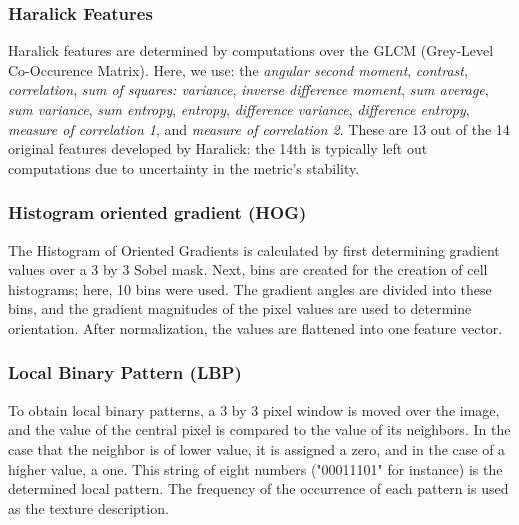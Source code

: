 
\subsubsection{Haralick Features}

Haralick features \cite{Haralick_1973} are determined by computations over the GLCM (Grey-Level Co-Occurence Matrix). Here, we use: the \emph{angular second moment}, \emph{contrast}, \emph{correlation}, \emph{sum of squares: variance}, \emph{inverse difference moment}, \emph{sum average}, \emph{sum variance}, \emph{sum entropy}, \emph{entropy}, \emph{difference variance}, \emph{difference entropy}, \emph{measure of correlation 1}, and \emph{measure of correlation 2}. These are 13 out of the 14 original features developed by Haralick: the 14th is typically left out computations due to uncertainty in the metric's stability. 

\subsubsection{Histogram oriented gradient (HOG)}

The Histogram of Oriented Gradients is calculated by first determining gradient values over a 3 by 3 Sobel mask. Next, bins are created for the creation of cell histograms; here, 10 bins were used. The gradient angles are divided into these bins, and the gradient magnitudes of the pixel values are used to determine orientation. After normalization, the values are flattened into one feature vector. 

\subsubsection{Local Binary Pattern (LBP)}

To obtain local binary patterns, a 3 by 3 pixel window is moved over the image, and the value of the central pixel is compared to the value of its neighbors. In the case that the neighbor is of lower value, it is assigned a zero, and in the case of a higher value, a one. This string of eight numbers ("00011101" for instance) is the determined local pattern. The frequency of the occurrence of each pattern is used as the texture description. 
  
  

  
  
  
  
  
  
